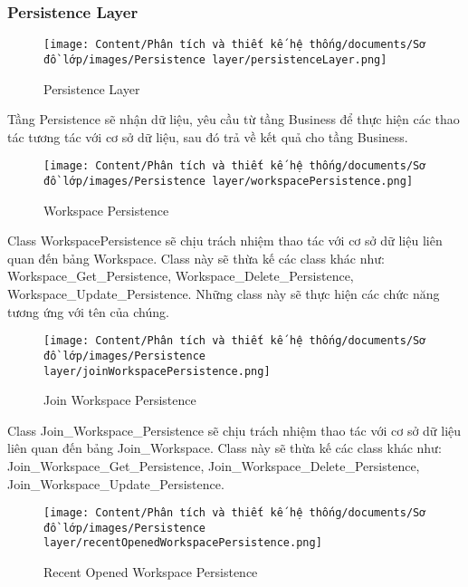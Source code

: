 \subsubsection{Persistence Layer}

\begin{figure}[H]
    \centering
    \texttt{[image: Content/Phân tích và thiết kế hệ thống/documents/Sơ đồ lớp/images/Persistence layer/persistenceLayer.png]}
    \vspace{0.5cm}
    \caption{Persistence Layer}
    \label{fig:Persistence Layer}
\end{figure}
Tầng Persistence sẽ nhận dữ liệu, yêu cầu từ tầng Business để thực hiện các thao tác tương tác với cơ sở dữ liệu, sau đó trả về kết quả cho tầng Business.

\begin{figure}[H]
    \centering
    \texttt{[image: Content/Phân tích và thiết kế hệ thống/documents/Sơ đồ lớp/images/Persistence layer/workspacePersistence.png]}
    \vspace{0.5cm}
    \caption{Workspace Persistence}
    \label{fig:Workspace Persistence}
\end{figure}
\par
Class WorkspacePersistence sẽ chịu trách nhiệm thao tác với cơ sở dữ liệu 
liên quan đến bảng Workspace. Class này sẽ thừa kế các class khác như:
Workspace\_Get\_Persistence, Workspace\_Delete\_Persistence, Workspace\_Update\_Persistence.
Những class này sẽ thực hiện các chức năng tương ứng với tên của chúng.
\begin{figure}[H]
    \centering
    \texttt{[image: Content/Phân tích và thiết kế hệ thống/documents/Sơ đồ lớp/images/Persistence layer/joinWorkspacePersistence.png]}
    \vspace{0.5cm}
    \caption{Join Workspace Persistence}
    \label{fig:Join Workspace Persistence}
\end{figure}
\par
Class Join\_Workspace\_Persistence sẽ chịu trách nhiệm thao tác với cơ sở dữ liệu
liên quan đến bảng Join\_Workspace. Class này sẽ thừa kế các class khác như:
Join\_Workspace\_Get\_Persistence, Join\_Workspace\_Delete\_Persistence, Join\_Workspace\_Update\_Persistence.
\begin{figure}[H]
    \centering
    \texttt{[image: Content/Phân tích và thiết kế hệ thống/documents/Sơ đồ lớp/images/Persistence layer/recentOpenedWorkspacePersistence.png]}
    \vspace{0.5cm}
    \caption{Recent Opened Workspace Persistence}
    \label{fig:Recent Opened Workspace Persistence}
\end{figure}

